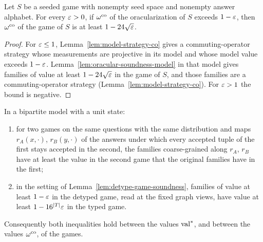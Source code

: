 \begin{lemma}
\label{lem:oracular-soundness-co}
\leanok
Let $S$ be a seeded game with nonempty seed space and nonempty answer alphabet. For every
$\varepsilon > 0$, if $\omega^{\mathrm{co}}$ of the oracularization of $S$ exceeds $1 - \varepsilon$, then $\omega^{\mathrm{co}}$ of
the game of $S$ is at least $1 - 24\sqrt{\varepsilon}$.
\end{lemma}

\begin{proof}
\leanok
For $\varepsilon \leq 1$, Lemma~\ref{lem:model-strategy-co} gives a commuting-operator strategy whose
measurements are projective in its model and whose model value exceeds $1 - \varepsilon$.
Lemma~\ref{lem:oracular-soundness-model} in that model gives families of value at least
$1 - 24\sqrt{\varepsilon}$ in the game of $S$, and those families are a commuting-operator strategy
(Lemma~\ref{lem:model-strategy-co}). For $\varepsilon > 1$ the bound is negative.
\end{proof}

\begin{lemma}
\label{lem:transports-model}
\leanok
In a bipartite model with a unit state:
\begin{enumerate}
\item for two games on the same questions with the same distribution and maps
  $r_A(x, \cdot)$, $r_B(y, \cdot)$ of the answers under which every accepted tuple of the first
  stays accepted in the second, the families coarse-grained along $r_A$, $r_B$ have at least the
  value in the second game that the original families have in the first;
\item in the setting of Lemma~\ref{lem:detype-game-soundness}, families of value at least
  $1 - \varepsilon$ in the detyped game, read at the fixed graph views, have value at least
  $1 - 16^{|T|}\varepsilon$ in the typed game.
\end{enumerate}
Consequently both inequalities hold between the values $\mathrm{val}^*$, and between the values
$\omega^{\mathrm{co}}$, of the games.
\end{lemma}

